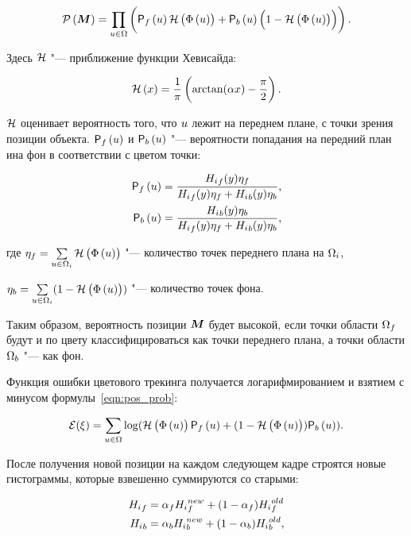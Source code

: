 \begin{equation}
\label{eqn:pos_prob}
    \mathcal{P} \left( \bm{M} \right)  = \prod\limits_{\mathnormal{u} \in \Omega} \left(
        \mathsf{P}_f \left( \mathnormal{u} \right) \mathcal{H} \left( \Phi \left( \mathnormal{u} \right) \right)
        + \mathsf{P}_b \left( \mathnormal{u} \right) \left( 1 - \mathcal{H} \left( \Phi \left( \mathnormal{u} \right) \right) \right)
    \right)
\text{.}
\end{equation}

Здесь $\mathcal{H}$ "--- приближение функции Хевисайда:

\begin{equation}
\label{eqn:heaviside}
    \mathcal{H} \left( x \right) = \frac{1}{\pi} \left( \arctan(\alpha x) - \frac{\pi}{2} \right)
\text{.}
\end{equation}

$\mathcal{H}$ оценивает вероятность того, что $\mathnormal{u}$ лежит на переднем плане, с точки
зрения позиции объекта.
$\mathsf{P}_f \left( \mathnormal{u} \right)$ и $\mathsf{P}_b \left( \mathnormal{u} \right)$ "--- вероятности попадания на передний план ина фон в соответствии с цветом точки:

\begin{align}
\label{eqn:Pfu}
    \mathsf{P}_f \left( \mathnormal{u} \right) &= \frac{{H_i}_f(y)\eta_f}{{H_i}_f(y)\eta_f +
        {H_i}_b(y)\eta_b} \text{,} \\
    \mathsf{P}_b \left( \mathnormal{u} \right) &=\frac{{H_i}_b(y)\eta_b}{{H_i}_f(y)\eta_f +
        {H_i}_b(y)\eta_b} \text{,}
\end{align}

где
$
    \eta_f = \sum\limits_{\mathnormal{u} \in \Omega_i}\mathcal{H} \left( \Phi \left( \mathnormal{u} \right) \right)
$ "--- количество точек переднего плана на $\Omega_i$,

$
    \eta_b = \sum\limits_{\mathnormal{u} \in \Omega_i}(1 - \mathcal{H} \left( \Phi \left( \mathnormal{u} \right) \right))
$ "--- количество точек фона.


Таким образом, вероятность позиции $\bm{M}$ будет высокой, если точки области
$\Omega_f$ будут и по цвету классифицироваться как точки переднего плана, а
точки области $\Omega_b$ "--- как фон.

Функция ошибки цветового трекинга получается логарифмированием и взятием с
минусом
формулы~\ref{eqn:pos_prob}:

\begin{equation}
\label{eqn:err_func}
\mathcal{E}(\xi) = \sum\limits_{\mathnormal{u} \in \Omega}
\log(\mathcal{H} \left( \Phi \left( \mathnormal{u} \right) \right) \mathsf{P}_f \left( \mathnormal{u} \right) + (1 - \mathcal{H} \left( \Phi \left( \mathnormal{u} \right) \right))\mathsf{P}_b \left( \mathnormal{u} \right))
\text{.}
\end{equation}

После получения новой позиции на каждом следующем кадре строятся новые
гистограммы, которые взвешенно суммируются со старыми: 

\begin{align}
{\ensuremath{H_i}}_f &= \alpha_f {H_i}_f^{new} + (1 - \alpha_f) {H_i}_f^{old} \\{H_i}_b &= \alpha_b {H_i}_b^{new} + (1 - \alpha_b) {H_i}_b^{old}\text{,}
\end{align}

